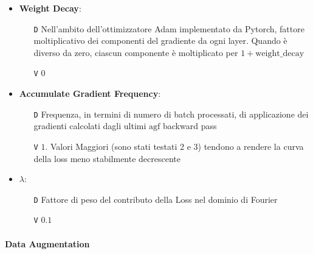 \documentclass[a4paper,10pt,twocolumn]{article}
\begin{document}
\begin{itemize}[topsep=5pt, itemsep=7pt]
  \item
    \textbf{Weight Decay}:
    \begin{itemize}[topsep=0pt, noitemsep]
      \item[\texttt{D}] Nell'ambito dell'ottimizzatore Adam implementato da Pytorch, fattore moltiplicativo dei componenti del gradiente da
        ogni layer.  Quando \`e diverso da zero, ciascun componente \`e moltiplicato per $1 + \mathrm{weight\_decay}$
      \item[\texttt{V}] $0$
    \end{itemize}

  \item
    \textbf{Accumulate Gradient Frequency}:
    \begin{itemize}[topsep=0pt, noitemsep]
      \item[\texttt{D}] Frequenza, in termini di numero di batch processati, di applicazione dei gradienti calcolati dagli ultimi
        $\mathrm{agf}$ backward pass
      \item[\texttt{V}] $1$. Valori Maggiori (sono stati testati 2 e 3) tendono a rendere la curva della loss meno stabilmente decrescente
    \end{itemize}

  \item
    \textbf{$\lambda$}:
    \begin{itemize}[topsep=0pt, noitemsep]
      \item[\texttt{D}] Fattore di peso del contributo della Loss nel dominio di Fourier
      \item[\texttt{V}] $0.1$
    \end{itemize}
\end{itemize}

\paragraph{Data Augmentation}
\end{document}
